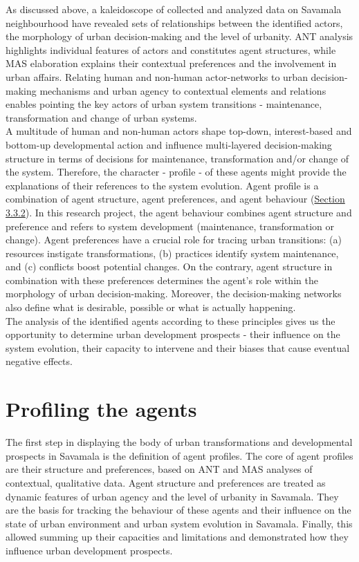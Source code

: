 \documentclass[11pt]{report}
\begin{document}
As discussed above, a kaleidoscope of collected and analyzed data on Savamala neighbourhood have revealed sets of relationships between the identified actors, the morphology of urban decision-making and the level of urbanity.
ANT analysis highlights individual features of actors and constitutes agent structures, while MAS elaboration explains their contextual preferences and the involvement in urban affairs.
Relating human and non-human actor-networks to urban decision- making mechanisms and urban agency to contextual elements and relations enables pointing the key actors of urban system  transitions - maintenance, transformation and change of urban systems.
\\

A multitude of human and non-human actors shape top-down, interest-based and bottom-up developmental action and influence multi-layered decision-making structure in terms of decisions for maintenance, transformation and/or change of the system. 
Therefore, the character - profile - of these agents might provide the explanations of their references to the system evolution.
Agent profile is a combination of agent structure, agent preferences, and agent behaviour (\href{Section 3.3.2}{Section 3.3.2}).
In this research project, the agent behaviour combines agent structure and preference and refers to system development (maintenance, transformation or change). 
Agent preferences have a crucial role for tracing urban transitions:
(a) resources instigate transformations,
(b) practices identify system maintenance,
and
(c) conflicts boost potential changes.
On the contrary, agent structure in combination with these preferences determines the agent's role within the morphology of urban decision-making.
Moreover, the decision-making networks also define what is desirable, possible or what is actually happening.
\\

The analysis of the identified agents according to these principles gives us the opportunity to determine urban development prospects - their influence on the system evolution, their capacity to intervene and their biases that cause eventual negative effects.

\section{Profiling the agents}

The first step in displaying the body of urban transformations and developmental prospects in Savamala is the definition of agent profiles.
The core of agent profiles are their structure and preferences, based on ANT and MAS analyses of contextual, qualitative data. Agent structure and preferences are treated as dynamic features of urban agency and the level of urbanity in Savamala.
They are the basis for tracking the behaviour of these agents and their influence on the state of urban environment and urban system evolution in Savamala.
Finally, this allowed summing up their capacities and limitations and demonstrated how they influence urban development prospects.
\\
\end{document}
